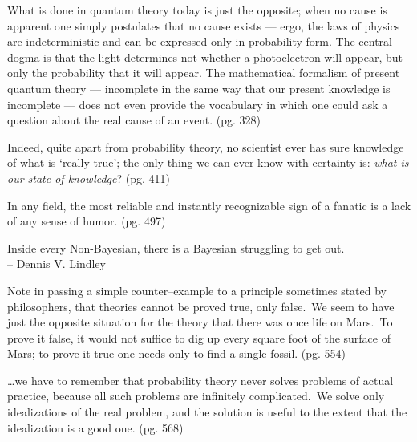 \documentclass[8pt]{article}
\begin{document}
    \begin{displayquote}
        What is done in quantum theory today is just the opposite; when no cause is apparent one simply postulates that no cause exists --- ergo, the laws of physics are indeterministic and can be expressed only in probability form. The central dogma is that the light determines not whether a photoelectron will appear, but only the probability that it will appear. The mathematical formalism of present quantum theory --- incomplete in the same way that our present knowledge is incomplete --- does not even provide the vocabulary in which one could ask a question about the real cause of an event. (pg. 328) 
    \end{displayquote}

    \begin{displayquote}
        Indeed, quite apart from probability theory, no scientist ever has sure knowledge of what is `really true'; the only thing we can ever know with certainty is: \textit{what is our state of knowledge}? (pg. 411)
    \end{displayquote}

    \begin{displayquote}
        In any field, the most reliable and instantly recognizable sign of a fanatic is a lack of any sense of humor. (pg. 497)
    \end{displayquote}
    
    \begin{displayquote}
        Inside every Non-Bayesian, there is a Bayesian struggling to get out. \\
        -- Dennis V. Lindley
    \end{displayquote}

    \begin{displayquote}
        Note in passing a simple counter--example to a principle sometimes stated by philosophers, that theories cannot be proved true, only false.\ We seem to have just the opposite situation for the theory that there was once life on Mars.\ To prove it false, it would not suffice to dig up every square foot of the surface of Mars; to prove it true one needs only to find a single fossil. (pg. 554)
    \end{displayquote}

    \begin{displayquote} 
        \ldots we have to remember that probability theory never solves problems of actual practice, because all such problems are infinitely complicated.\ We solve only idealizations of the real problem, and the solution is useful to the extent that the idealization is a good one. (pg. 568)
    \end{displayquote}
\end{document}
